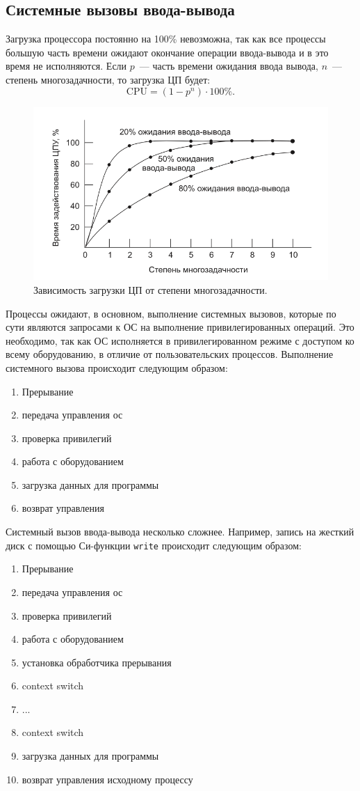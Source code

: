 \subsection{Системные вызовы ввода-вывода}
Загрузка процессора постоянно на 100\% невозможна, так как все процессы большую часть времени ожидают окончание операции ввода-вывода и в это время не исполняются. Если $p$~--- часть времени ожидания ввода вывода, $n$~--- степень многозадачности, то загрузка ЦП будет:
\[ \mathrm{CPU} = (1 - p^n)\cdot 100\%. \]
\begin{figure}[H]\centering
  \includegraphics[width=14cm]{lectures/L9/power-of.png}
  \caption{Зависимость загрузки ЦП от степени многозадачности.}
\end{figure}
Процессы ожидают, в основном, выполнение системных вызовов, которые по сути являются запросами к ОС на выполнение привилегированных операций. Это необходимо, так как ОС исполняется в привилегированном режиме с доступом ко всему оборудованию, в отличие от пользовательских процессов. Выполнение системного вызова происходит следующим образом:
\begin{enumerate}[nosep]
  \item Прерывание
  \item передача управления ос
  \item проверка привилегий
  \item работа с оборудованием
  \item загрузка данных для программы
  \item возврат управления
\end{enumerate}
Системный вызов ввода-вывода несколько сложнее. Например, запись на жесткий диск с помощью Си-функции \verb|write| происходит следующим образом:
\begin{enumerate}[nosep]
  \item Прерывание
  \item передача управления ос
  \item проверка привилегий
  \item работа с оборудованием
  \item установка обработчика прерывания
  \item context switch
  \item ...
  \item context switch
  \item загрузка данных для программы
  \item возврат управления исходному процессу
\end{enumerate}
